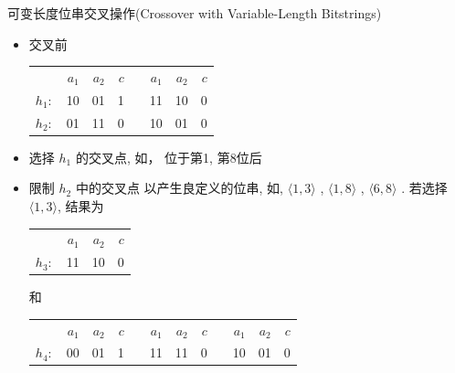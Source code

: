 \documentclass[presentation]{beamer}
\begin{document}
\begin{frame}[label={sec:org3bb1b29}]{可变长度位串交叉操作(Crossover with Variable-Length Bitstrings)}
\begin{itemize}
\item 交叉前
\begin{center}
\begin{tabular}{lrrrlrrr}
 & \(a_{1}\) & \(a_{2}\) & \(c\) &  & \(a_{1}\) & \(a_{2}\) & \(c\)\\
\(h_{1}:\) & 10 & 01 & 1 &  & 11 & 10 & 0\\
\(h_{2}:\) & 01 & 11 & 0 &  & 10 & 01 & 0\\
\end{tabular}
\end{center}
\item 选择 \(h_1\) 的交叉点, 如， 位于第1, 第8位后
\item 限制 \(h_2\) 中的交叉点 以产生良定义的位串, 如, \(\langle 1,3 \rangle\) , \(\langle 1,8 \rangle\) , \(\langle 6,8 \rangle\) .
若选择 \(\langle 1,3 \rangle\), 结果为
\begin{center}
\begin{tabular}{lrrr}
 & \(a_{1}\) & \(a_{2}\) & \(c\)\\
\(h_{3}:\) & 11 & 10 & 0\\
\end{tabular}
\end{center}
和
\begin{center}
\begin{tabular}{lrrrlrrrlrrr}
 & \(a_{1}\) & \(a_{2}\) & \(c\) &  & \(a_{1}\) & \(a_{2}\) & \(c\) &  & \(a_{1}\) & \(a_{2}\) & \(c\)\\
\(h_{4}:\) & 00 & 01 & 1 &  & 11 & 11 & 0 &  & 10 & 01 & 0\\
\end{tabular}
\end{center}
\end{itemize}
\end{frame}
\end{document}
